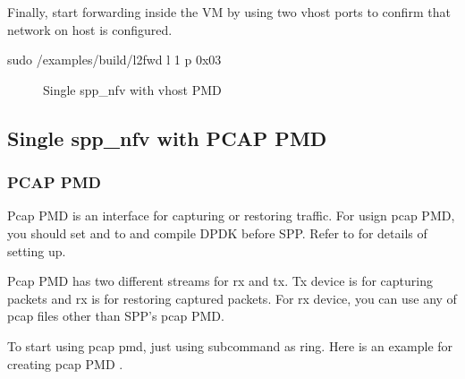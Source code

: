 \documentclass[a4paper,11pt,openany,oneside,english]{sphinxmanual}
\begin{document}
Finally, start forwarding inside the VM by using two vhost ports
to confirm that network on host is configured.

\begin{sphinxVerbatim}[commandchars=\\\{\},formatcom=\footnotesize]
 sudo /examples/build/l2fwd \PYGZhy{}l \PYGZhy{}1 \PYGZhy{}\PYGZhy{} \PYGZhy{}p 0x03
\end{sphinxVerbatim}

\begin{figure}[htbp]
\centering
\capstart

\noindent{}
\caption{Single spp\_nfv with vhost PMD}\label{\detokenize{usecases/spp_nfv:id6}}\label{\detokenize{usecases/spp_nfv:figure-spp-nfv-l2fwd-vhost}}\end{figure}


\subsection{Single spp\_nfv with PCAP PMD}
\label{\detokenize{usecases/spp_nfv:single-spp-nfv-with-pcap-pmd}}

\subsubsection{PCAP PMD}
\label{\detokenize{usecases/spp_nfv:pcap-pmd}}
Pcap PMD is an interface for capturing or restoring traffic.
For usign pcap PMD, you should set 
and  to  and compile DPDK before SPP.
Refer to
{\hyperref[\detokenize{gsg/install:setup-install-dpdk-spp}]{}}
for details of setting up.

Pcap PMD has two different streams for rx and tx.
Tx device is for capturing packets and rx is for restoring captured
packets.
For rx device, you can use any of pcap files other than SPP’s pcap PMD.

To start using pcap pmd, just using  subcommand as ring.
Here is an example for creating pcap PMD .

\begin{sphinxVerbatim}[commandchars=\\\{\},formatcom=\footnotesize]
\end{sphinxVerbatim}
\end{document}
